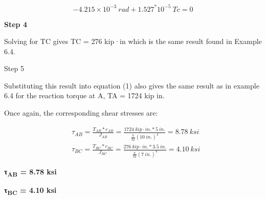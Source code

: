 \documentclass[
  letterpaper,
  DIV=11,
  numbers=noendperiod]{scrreprt}
\theoremstyle{definition}
\theoremstyle{remark}
\begin{document}
\begin{tcolorbox}
\begin{tcolorbox}
\[
-4.215 \times 10^{-3}{~rad}+1.527^* 10^{-5}~T{c}=0
\]

\textbf{Step 4}

Solving for TC gives TC = 276 kip·in which is the same result found in
Example 6.4.

Step 5

Substituting this result into equation (1) also gives the same result as
in example 6.4 for the reaction torque at A, TA = 1724 kip in.

Once again, the corresponding shear stresses are:

\[
\begin{aligned}
& \tau_{AB}=\frac{T_{AB}*c_{AB}}{J_{AB}}=\frac{1724{~kip}\cdot{in.}*5{~in.}}{\frac{\pi}{32}(10{~in.})^4}=8.78{~ksi} \\
& \tau_{BC}=\frac{T_{BC}*c_{BC}}{J_{BC}}=\frac{276{~kip}\cdot{in.}*3.5{~in.}}{\frac{\pi}{32}(7{~in.})^4}=4.10{~ksi}
\end{aligned}
\]

\textbf{τ\textsubscript{AB} = 8.78 ksi}

\textbf{τ\textsubscript{BC} = 4.10 ksi}

\end{tcolorbox}

\end{tcolorbox}
\end{document}

